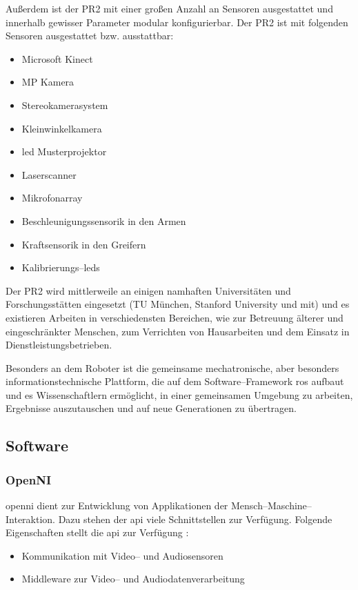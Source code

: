Außerdem ist der PR2 mit einer großen Anzahl an Sensoren ausgestattet und innerhalb gewisser Parameter modular konfigurierbar.
Der PR2 ist mit folgenden Sensoren ausgestattet bzw. ausstattbar:

\begin{itemize}
  \item Microsoft Kinect
  \item \unit[5]{MP} Kamera
  \item Stereokamerasystem
  \item Kleinwinkelkamera
  \item \gls{led} Musterprojektor
  \item Laserscanner
  \item Mikrofonarray
  \item Beschleunigungssensorik in den Armen
  \item Kraftsensorik in den Greifern
  \item Kalibrierungs--\glspl{led}
\end{itemize}

Der PR2 wird mittlerweile an einigen namhaften Universitäten und Forschungsstätten eingesetzt (\ua TU München, Stanford University und \gls{mit}) und es existieren Arbeiten in verschiedensten Bereichen, wie zur Betreuung älterer und eingeschränkter Menschen, zum Verrichten von Hausarbeiten  und dem Einsatz in Dienstleistungsbetrieben.

Besonders an dem Roboter ist die gemeinsame mechatronische, aber besonders informationstechnische Plattform, die auf dem Software--Framework \gls{ros} aufbaut und es Wissenschaftlern ermöglicht, in einer gemeinsamen Umgebung zu arbeiten, Ergebnisse auszutauschen und auf neue Generationen zu übertragen.



\subsection{Software}

\subsubsection{OpenNI}

\gls{openni} dient zur Entwicklung von Applikationen der Mensch--Maschine--Interaktion.
Dazu stehen der \gls{api} viele Schnittstellen zur Verfügung.
Folgende Eigenschaften stellt die \gls{api} zur Verfügung \cite{kinect_6}:

\begin{itemize}
  \item Kommunikation mit Video-- und Audiosensoren
  \item Middleware zur Video-- und Audiodatenverarbeitung
\end{itemize}

